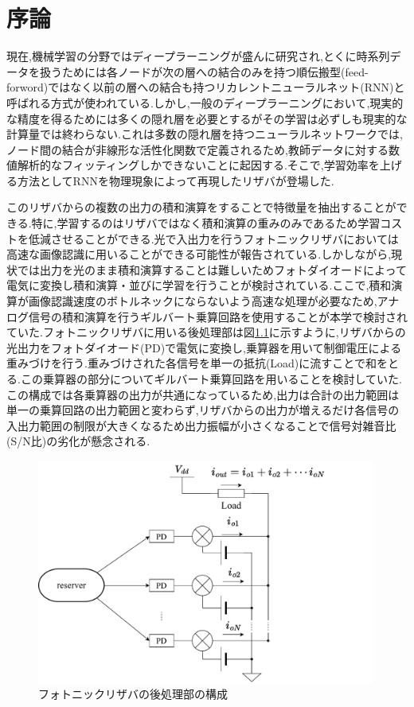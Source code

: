 \chapter{序論}
現在,機械学習の分野ではディープラーニングが盛んに研究され,とくに時系列データを扱うためには各ノードが次の層への結合のみを持つ順伝搬型(feed-forword)ではなく以前の層への結合も持つリカレントニューラルネット(RNN)と呼ばれる方式が使われている.しかし,一般のディープラーニングにおいて,現実的な精度を得るためには多くの隠れ層を必要とするがその学習は必ずしも現実的な計算量では終わらない.これは多数の隠れ層を持つニューラルネットワークでは,ノード間の結合が非線形な活性化関数で定義されるため,教師データに対する数値解析的なフィッティングしかできないことに起因する.そこで,学習効率を上げる方法としてRNNを物理現象によって再現したリザバが登場した.\par
このリザバからの複数の出力の積和演算をすることで特徴量を抽出することができる.特に,学習するのはリザバではなく積和演算の重みのみであるため学習コストを低減させることができる.光で入出力を行うフォトニックリザバにおいては高速な画像認識に用いることができる可能性が報告されている.しかしながら,現状では出力を光のまま積和演算することは難しいためフォトダイオードによって電気に変換し積和演算・並びに学習を行うことが検討されている.ここで,積和演算が画像認識速度のボトルネックにならないよう高速な処理が必要なため,アナログ信号の積和演算を行うギルバート乗算回路を使用することが本学で検討されていた.フォトニックリザバに用いる後処理部は図\ref{fig:1_config}に示すように,リザバからの光出力をフォトダイオード(PD)で電気に変換し,乗算器を用いて制御電圧による重みづけを行う.重みづけされた各信号を単一の抵抗(Load)に流すことで和をとる.この乗算器の部分についてギルバート乗算回路を用いることを検討していた.この構成では各乗算器の出力が共通になっているため,出力は合計の出力範囲は単一の乗算回路の出力範囲と変わらず,リザバからの出力が増えるだけ各信号の入出力範囲の制限が大きくなるため出力振幅が小さくなることで信号対雑音比(S/N比)の劣化が懸念される.
\begin{figure}
        \begin{center}
        \includegraphics[width=0.99\textwidth]{figures/chapter1/config.pdf}
        \caption{フォトニックリザバの後処理部の構成}
        \label{fig:1_config}
    \end{center}
\end{figure}
